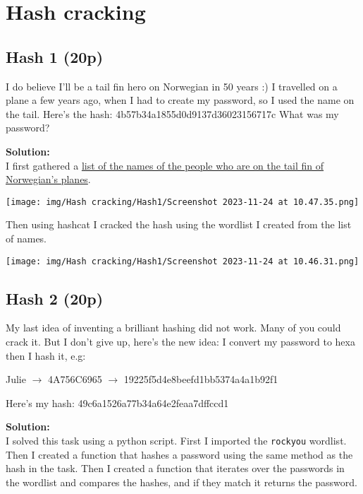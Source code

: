 \section{Hash cracking}

\subsection{Hash 1 (20p)}
\addtocounter{points}{20}
I do believe I'll be a tail fin hero on Norwegian in 50 years :) I travelled on a plane a few years ago, when I had to create my password, so I used the name on the tail. Here's the hash: 4b57b34a1855d0d9137d36023156717c What was my password?

\textbf{Solution:}\\
I first gathered a \href{https://en.wikipedia.org/wiki/List_of_Norwegian_Air_Shuttle_tail_fin_heroes_and_fleet}{list of the names of the people who are on the tail fin of Norwegian's planes}.

\begin{center}
    \texttt{[image: img/Hash cracking/Hash1/Screenshot 2023-11-24 at 10.47.35.png]}
\end{center}

Then using hashcat I cracked the hash using the wordlist I created from the list of names.

\begin{center}
    \texttt{[image: img/Hash cracking/Hash1/Screenshot 2023-11-24 at 10.46.31.png]}
\end{center}


\subsection{Hash 2 (20p)}
\addtocounter{points}{20}
My last idea of inventing a brilliant hashing did not work. Many of you could crack it. But I don't give up, here's the new idea: I convert my password to hexa then I hash it, e.g:

Julie \(\rightarrow\) 4A756C6965 \(\rightarrow\) 19225f5d4e8beefd1bb5374a4a1b92f1

Here's my hash: 49c6a1526a77b34a64e2feaa7dffccd1

\textbf{Solution:}\\
I solved this task using a python script. First I imported the \texttt{rockyou} wordlist.
Then I created a function that hashes a password using the same method as the hash in the task.
Then I created a function that iterates over the passwords in the wordlist and compares the hashes, and if they match it returns the password.

